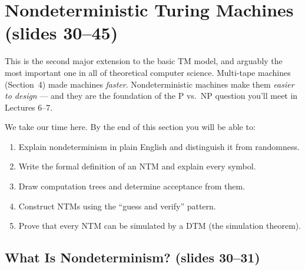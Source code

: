 \section{Nondeterministic Turing Machines (slides 30--45)} \kemark

This is the second major extension to the basic TM model, and arguably the most
important one in all of theoretical computer science. Multi-tape machines
(Section~4) made machines \emph{faster}. Nondeterministic machines make them
\emph{easier to design} --- and they are the foundation of the P vs.\ NP
question you'll meet in Lectures 6--7.

We take our time here. By the end of this section you will be able to:
\begin{enumerate}[nosep]
\item Explain nondeterminism in plain English and distinguish it from randomness.
\item Write the formal definition of an NTM and explain every symbol.
\item Draw computation trees and determine acceptance from them.
\item Construct NTMs using the ``guess and verify'' pattern.
\item Prove that every NTM can be simulated by a DTM (the simulation theorem).
\end{enumerate}

\subsection{What Is Nondeterminism? (slides 30--31)}
\label{subsec:what-is-nondeterminism}

